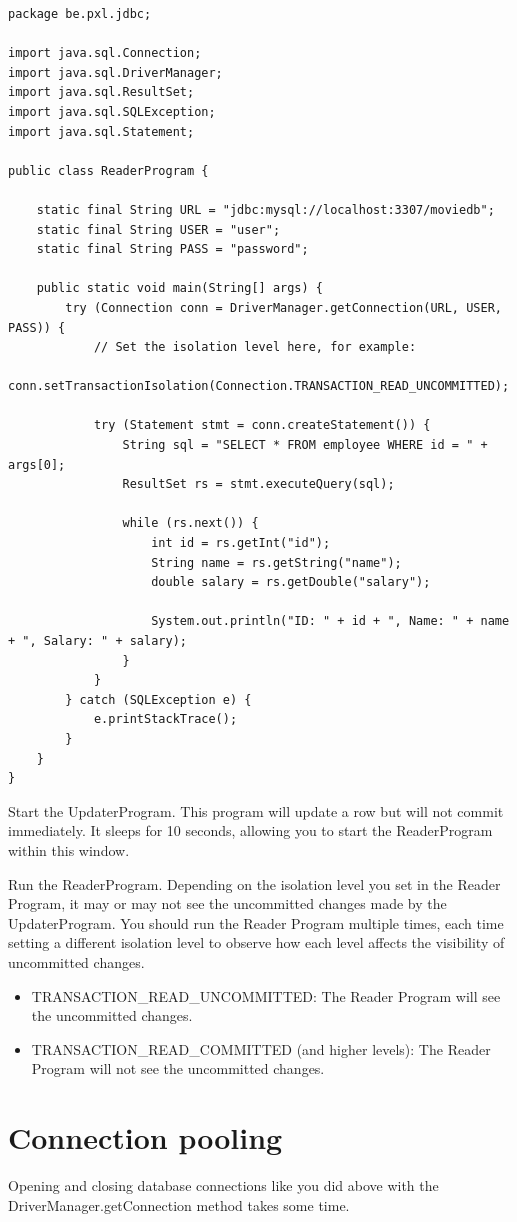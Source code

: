 \begin{lstlisting}
package be.pxl.jdbc;

import java.sql.Connection;
import java.sql.DriverManager;
import java.sql.ResultSet;
import java.sql.SQLException;
import java.sql.Statement;

public class ReaderProgram {

	static final String URL = "jdbc:mysql://localhost:3307/moviedb";
	static final String USER = "user";
	static final String PASS = "password";

	public static void main(String[] args) {
		try (Connection conn = DriverManager.getConnection(URL, USER, PASS)) {
			// Set the isolation level here, for example:
			conn.setTransactionIsolation(Connection.TRANSACTION_READ_UNCOMMITTED);

			try (Statement stmt = conn.createStatement()) {
				String sql = "SELECT * FROM employee WHERE id = " + args[0];
				ResultSet rs = stmt.executeQuery(sql);

				while (rs.next()) {
					int id = rs.getInt("id");
					String name = rs.getString("name");
					double salary = rs.getDouble("salary");

					System.out.println("ID: " + id + ", Name: " + name + ", Salary: " + salary);
				}
			}
		} catch (SQLException e) {
			e.printStackTrace();
		}
	}
}
\end{lstlisting}

Start the UpdaterProgram. This program will update a row but will not commit immediately. It sleeps for 10 seconds, allowing you to start the ReaderProgram within this window.

Run the ReaderProgram.  Depending on the isolation level you set in the Reader Program, it may or may not see the uncommitted changes made by the UpdaterProgram. You should run the Reader Program multiple times, each time setting a different isolation level to observe how each level affects the visibility of uncommitted changes.

\begin{itemize}
\item TRANSACTION\_READ\_UNCOMMITTED: The Reader Program will see the uncommitted changes.
\item TRANSACTION\_READ\_COMMITTED (and higher levels): The Reader Program will not see the uncommitted changes.
\end{itemize}


\section{Connection pooling}
Opening and closing database connections like you did above with the DriverManager.getConnection method takes some time.

